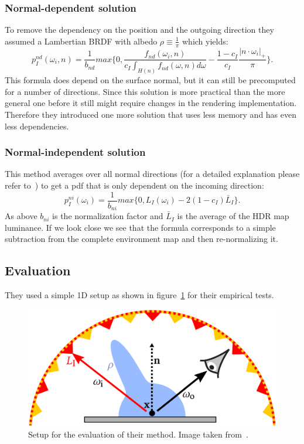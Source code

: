 \subsubsection{Normal-dependent solution}
\label{sec:ibl_normal_dependent}
To remove the dependency on the position and the outgoing direction they assumed a Lambertian BRDF with albedo $ \rho \equiv \frac{1}{\pi} $
which yields:
\begin{equation}
    \label{eq:normal_dependent}
    p_I^{nd}(\omega_i, n) = \frac{1}{b_{nd}} max\{0, \frac{f_{nd}(\omega_i, n)}{c_I \int_{H(n)} f_{nd}(\omega, n) d\omega} - \frac{1 - c_I}{c_I} \frac{|n \cdot \omega_i|_+}{\pi}\}.
\end{equation}
This formula does depend on the surface normal,
but it can still be precomputed for a number of directions.
Since this solution is more practical than the more general one before it still might require changes in the rendering implementation.
Therefore they introduced one more solution that uses less memory and has even less dependencies.


\subsubsection{Normal-independent solution}
\label{sec:ibl_normal_independent}
This method averages over all normal directions (for a detailed explanation please refer to~\cite[Appendix~D]{Karlik2019})
to get a pdf that is only dependent on the incoming direction: $$ p_I^{ni}(\omega_i) = \frac{1}{b_{ni}} max\{0, L_I(\omega_i) - 2 (1 - c_I) \bar{L}_I\}. $$
As above $ b_{ni} $ is the normalization factor and $ \bar{L}_I $ is the average of the HDR map luminance.
If we look close we see that the formula corresponds to a simple subtraction from the complete environment map and then re-normalizing it.


\subsection{Evaluation}
\label{sec:ibl_evalution}
They used a simple 1D setup as shown in figure~\ref{fig:ibl_setup} for their empirical tests.

\begin{figure}[h]
    \centering
    \includegraphics[width=.4\textwidth]{images/ibl_setup.png}
    \caption{Setup for the evaluation of their method.
    Image taken from~\cite[Figure~3]{Karlik2019}.}
    \label{fig:ibl_setup}
\end{figure}

